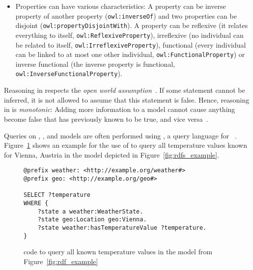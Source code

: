 \begin{itemize}
  \item Properties can have various characteristics: A property can be inverse property of another property (\texttt{owl:inverseOf}) and two properties can be disjoint (\texttt{owl:property\hspace{0pt}Disjoint\hspace{0pt}With}). A property can be reflexive (it relates everything to itself, \texttt{owl:\hspace{0pt}Reflexive\hspace{0pt}Property}), irreflexive (no individual can be related to itself, \texttt{owl:\hspace{0pt}Irreflexive\hspace{0pt}Property}), functional (every individual can be linked to at most one other individual, \texttt{owl:\hspace{0pt}Functional\hspace{0pt}Property}) or inverse functional (the inverse property is functional, \texttt{owl:\hspace{0pt}Inverse\hspace{0pt}Functional\hspace{0pt}Property}).
\end{itemize}

Reasoning in  respects the \emph{open world assumption}~\cite{open_world_assumption1,open_world_assumption2}. If some statement cannot be inferred, it is not allowed to assume that this statement is false. Hence, reasoning in  is \emph{monotonic}: Adding more information to a model cannot cause anything become false that has previously known to be true, and vice versa~\cite{MonotonicReasoning}.

Queries on , , and  models are often performed using , a query language for ~\cite{SPARQL}. Figure~\ref{fig:sparql_example} shows an example for the use of  to query all temperature values known for Vienna, Austria in the  model depicted in Figure~\ref{fig:rdfs_example}.

\begin{figure}
\begin{lstlisting}
@prefix weather: <http://example.org/weather#>
@prefix geo: <http://example.org/geo#>

SELECT ?temperature
WHERE {
    ?state a weather:WeatherState.
    ?state geo:Location geo:Vienna.
    ?state weather:hasTemperatureValue ?temperature.
}
\end{lstlisting}
\caption{ code to query all known temperature values in the model from Figure~\ref{fig:rdf_example}}
\label{fig:sparql_example}
\end{figure}

